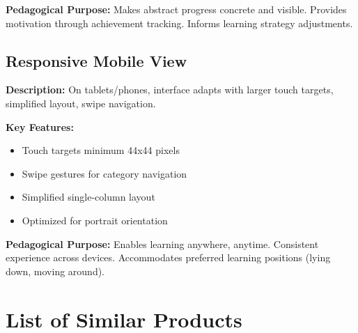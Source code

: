 \documentclass[11pt, a4paper]{article}
\begin{document}
\textbf{Pedagogical Purpose:} Makes abstract progress concrete and visible. Provides motivation through achievement tracking. Informs learning strategy adjustments.

\subsection{Responsive Mobile View}
\textbf{Description:} On tablets/phones, interface adapts with larger touch targets, simplified layout, swipe navigation.

\textbf{Key Features:}
\begin{itemize}[leftmargin=*, noitemsep]
    \item Touch targets minimum 44x44 pixels
    \item Swipe gestures for category navigation
    \item Simplified single-column layout
    \item Optimized for portrait orientation
\end{itemize}

\textbf{Pedagogical Purpose:} Enables learning anywhere, anytime. Consistent experience across devices. Accommodates preferred learning positions (lying down, moving around).

\newpage

\section{List of Similar Products}
\end{document}
